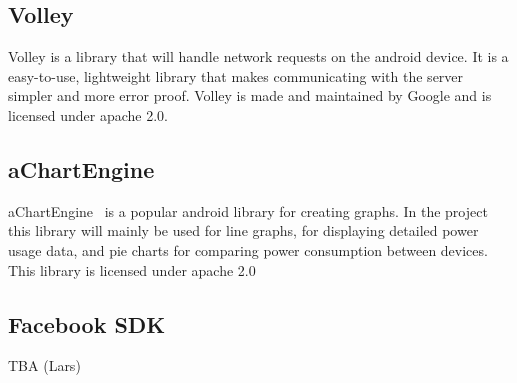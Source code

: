\subsection{Volley}
Volley is a library that will handle network requests on the android device. It is a easy-to-use, lightweight library that makes communicating with the server simpler and more error proof.  Volley is made and maintained by Google and is licensed under apache 2.0.

\subsection{aChartEngine}
aChartEngine~\cite{achart} is a popular android library for creating graphs. In the project this library will mainly be used for line graphs, for displaying detailed power usage data, and pie charts for comparing power consumption between devices. This library is licensed under apache 2.0~\cite{apache20}

\subsection{Facebook SDK}
TBA (Lars)
